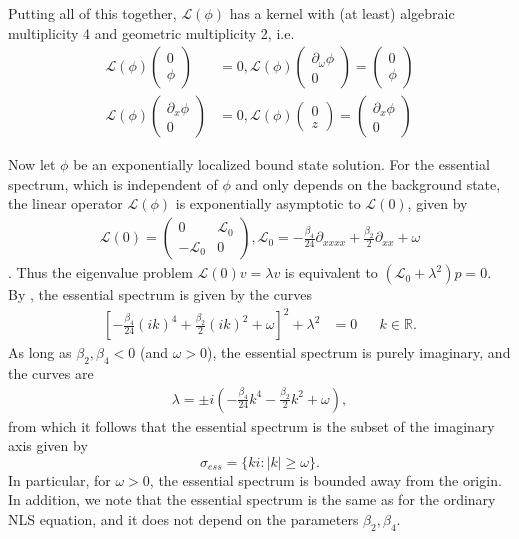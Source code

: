 \documentclass[12pt]{article}
\def\R{{\mathbb R}}
\def\calL{{\mathcal L}}
\begin{document}
Putting all of this together, $\calL(\phi)$ has a kernel with (at least) algebraic multiplicity 4 and geometric multiplicity 2, i.e.
\begin{align*}
\calL(\phi)\begin{pmatrix}0 \\ \phi \end{pmatrix} &= 0, 
\calL(\phi)\begin{pmatrix} \partial_\omega \phi \\ 0 \end{pmatrix} = \begin{pmatrix}0 \\ \phi \end{pmatrix} \\
\calL(\phi)\begin{pmatrix}\partial_x\phi \\ 0 \end{pmatrix} &= 0, 
\calL(\phi)\begin{pmatrix} 0 \\ z \end{pmatrix} = \begin{pmatrix}\partial_x\phi \\ 0 \end{pmatrix} 
\end{align*}

Now let $\phi$ be an exponentially localized bound state solution. For the essential spectrum, which is independent of $\phi$ and only depends on the background state, the linear operator $\calL(\phi)$ is exponentially asymptotic to $\calL(0)$, given by
\begin{align}\label{defL0}
\calL(0) = 
\begin{pmatrix}
0 & \calL_0 \\
-\calL_0 & 0
\end{pmatrix},
\calL_0 = -\frac{\beta_4}{24} \partial_{xxxx} + \frac{\beta_2}{2} \partial_{xx} + \omega
\end{align}.
Thus the eigenvalue problem $\calL(0) v = \lambda v$ is equivalent to $(\calL_0 + \lambda^2)p = 0$. By \cite[Theorem 3.1.13]{Kapitula2013}, the essential spectrum is given by the curves
\begin{align*}
\left[ -\frac{\beta_4}{24} (ik)^4 + \frac{\beta_2}{2}(ik)^2 + \omega \right]^2 + \lambda^2 &= 0 && k \in \R.
\end{align*}
As long as $\beta_2, \beta_4 < 0$ (and $\omega > 0$), the essential spectrum is purely imaginary, and the curves are
\begin{align*}
\lambda = \pm i \left( -\frac{\beta_4}{24}k^4 - \frac{\beta_2}{2}k^2 + \omega \right),
\end{align*}
from which it follows that the essential spectrum is the subset of the imaginary axis given by
\begin{equation}
\sigma_{ess} = \{ k i : |k| \geq \omega \}.
\end{equation}
In particular, for $\omega > 0$, the essential spectrum is bounded away from the origin. In addition, we note that the essential spectrum is the same as for the ordinary NLS equation, and it does not depend on the parameters $\beta_2,\beta_4$.
\end{document}
